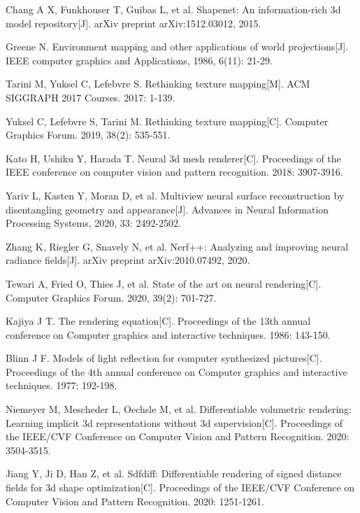 Chang A X, Funkhouser T, Guibas L, et al. Shapenet: An information-rich 3d model repository[J]. arXiv preprint arXiv:1512.03012, 2015.

Greene N. Environment mapping and other applications of world projections[J]. IEEE computer graphics and Applications, 1986, 6(11): 21-29.

 Tarini M, Yuksel C, Lefebvre S. Rethinking texture mapping[M]. ACM SIGGRAPH 2017 Courses. 2017: 1-139.

Yuksel C, Lefebvre S, Tarini M. Rethinking texture mapping[C]. Computer Graphics Forum. 2019, 38(2): 535-551.

Kato H, Ushiku Y, Harada T. Neural 3d mesh renderer[C]. Proceedings of the IEEE conference on computer vision and pattern recognition. 2018: 3907-3916.

Yariv L, Kasten Y, Moran D, et al. Multiview neural surface reconstruction by disentangling geometry and appearance[J]. Advances in Neural Information Processing Systems, 2020, 33: 2492-2502.

Zhang K, Riegler G, Snavely N, et al. Nerf++: Analyzing and improving neural radiance fields[J]. arXiv preprint arXiv:2010.07492, 2020.

Tewari A, Fried O, Thies J, et al. State of the art on neural rendering[C]. Computer Graphics Forum. 2020, 39(2): 701-727.


Kajiya J T. The rendering equation[C]. Proceedings of the 13th annual conference on Computer graphics and interactive techniques. 1986: 143-150.

Blinn J F. Models of light reflection for computer synthesized pictures[C]. Proceedings of the 4th annual conference on Computer graphics and interactive techniques. 1977: 192-198.

Niemeyer M, Mescheder L, Oechsle M, et al. Differentiable volumetric rendering: Learning implicit 3d representations without 3d supervision[C]. Proceedings of the IEEE/CVF Conference on Computer Vision and Pattern Recognition. 2020: 3504-3515.

Jiang Y, Ji D, Han Z, et al. Sdfdiff: Differentiable rendering of signed distance fields for 3d shape optimization[C]. Proceedings of the IEEE/CVF Conference on Computer Vision and Pattern Recognition. 2020: 1251-1261.

